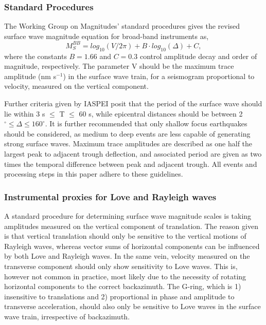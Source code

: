 \documentclass{gji}
\begin{document}
\subsubsection{Standard Procedures}\label{standproc}
The Working Group on Magnitudes' standard procedures gives the revised surface wave magnitude equation for broad-band instruments as,
\begin{equation}\label{eq:mag}
	M_S^{BB} = log_{10}(V/2\pi) + B\cdot log_{10}(\Delta) + C, 
\end{equation}
where the constants $B=1.66$ and $C=0.3$ control amplitude decay and order of magnitude, respectively. The parameter V should be the maximum trace amplitude (nm s$^{-1}$) in the surface wave train, for a seismogram proportional to velocity, measured on the vertical component. 

Further criteria given by IASPEI posit that the period of the surface wave should lie within 3 s $\le$ T $\le$ 60 s, while epicentral distances should be between 2$^\circ \le \Delta \le 160^\circ$. It is further recommended that only shallow focus earthquakes should be considered, as medium to deep events are less capable of generating strong surface waves. %
Maximum trace amplitudes are described as one half the largest peak to adjacent trough deflection, and associated period are given as two times the temporal difference between peak and adjacent trough. All events and processing steps in this paper adhere to these guidelines.

\subsubsection{Instrumental proxies for Love and Rayleigh waves}\label{proxy}
A standard procedure for determining surface wave magnitude scales is taking amplitudes measured on the vertical component of translation. The reason given is that vertical translation should only be sensitive to the vertical motions of Rayleigh waves, whereas vector sums of horizontal components can be influenced by both Love and Rayleigh waves. In the same vein, velocity measured on the transverse component should only show sensitivity to Love waves. This is, however not common in practice, most likely due to the necessity of rotating horizontal components to the correct backazimuth. The G-ring, which is 1) insensitive to translations and 2) proportional in phase and amplitude to transverse acceleration, should also only be sensitive to Love waves in the surface wave train, irrespective of backazimuth.  
\end{document}
